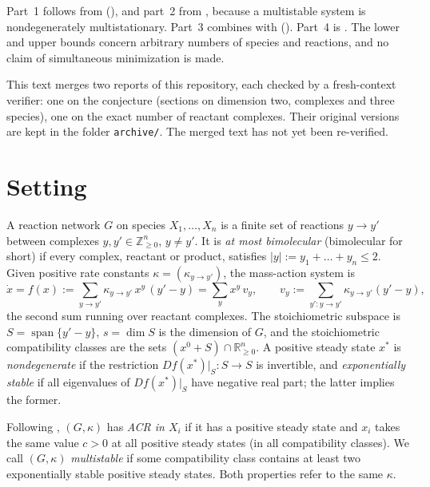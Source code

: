 \documentclass[11pt,a4paper]{report}
\newcommand{\Rnn}{\mathbb{R}_{\ge 0}}
\newcommand{\spn}{\operatorname{span}}
\begin{document}
Part~1 follows from  (), and part~2 from \autocite[Theorem~4.1]{KNS2024},
because a multistable system is nondegenerately multistationary. Part~3 combines  with
 (). Part~4 is . The lower and upper bounds concern
arbitrary numbers of species and reactions, and no claim of simultaneous minimization is made.

This text merges two reports of this repository, each checked by a fresh-context verifier: one on the conjecture
(sections on dimension two, complexes and three species), one on the exact number of reactant complexes. Their
original versions are kept in the folder \texttt{archive/}. The merged text has not yet been re-verified.

\section{Setting}\label{sec:setting}

A reaction network $G$ on species $X_1,\dots,X_n$ is a finite set of reactions $y\to y'$ between complexes
$y,y'\in\mathbb{Z}_{\ge0}^n$, $y\neq y'$. It is \emph{at most bimolecular} (bimolecular for short) if every
complex, reactant or product, satisfies $|y|:=y_1+\dots+y_n\le 2$. Given positive rate constants
$\kappa=(\kappa_{y\to y'})$, the mass-action system is
\begin{equation}\label{eq:ma}
\dot x=f(x):=\sum_{y\to y'}\kappa_{y\to y'}\,x^{y}\,(y'-y)=\sum_{y}x^{y}\,v_{y},\qquad
v_{y}:=\sum_{y'\colon y\to y'}\kappa_{y\to y'}(y'-y),
\end{equation}
the second sum running over reactant complexes. The stoichiometric subspace is
$S=\spn\{y'-y\}$, $s=\dim S$ is the dimension of $G$, and the stoichiometric compatibility classes are the sets
$(x^0+S)\cap\Rnn^n$. A positive steady state $x^*$ is \emph{nondegenerate} if the restriction $Df(x^*)|_S\colon S\to
S$ is invertible, and \emph{exponentially stable} if all eigenvalues of $Df(x^*)|_S$ have negative real part; the
latter implies the former.

\begin{definition}\label{def:acr-ms}
Following \autocite[Definition~2.6]{KNS2024}, $(G,\kappa)$ has \emph{ACR in $X_i$} if it has a positive steady state
and $x_i$ takes the same value $c>0$ at all positive steady states (in all compatibility classes). We call
$(G,\kappa)$ \emph{multistable} if some compatibility class contains at least two exponentially stable positive
steady states. Both properties refer to the same $\kappa$.
\end{definition}
\end{document}
